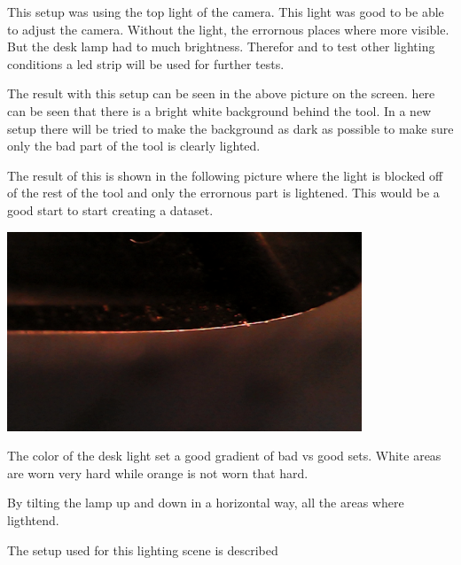 \documentclass{scrartcl}
\begin{document}
This setup was using the top light of the camera. This light was good to be able to adjust the camera. Without the light, the errornous places where more visible. But the desk lamp had to much brightness. Therefor and to test other lighting conditions a led strip will be used for further tests. 



The result with this setup can be seen in the above picture on the screen. here can be seen that there is a bright white background behind the tool. In a new setup there will be tried to make the background as dark as possible to make sure only the bad part of the tool is clearly lighted.



The result of this is shown in the following picture where the light is blocked off of the rest of the tool and only the errornous part is lightened. This would be a good start to start creating a dataset.



\includegraphics[width=4.166667in, keepaspectratio=true]{./Desk_Lamp_Test/eerste-opstelling_donkere_achtergrond2.jpg}



The color of the desk light set a good gradient of bad vs good sets. White areas are worn very hard while orange is not worn that hard.



By tilting the lamp up and down in a horizontal way, all the areas where ligthtend. 



The setup used for this lighting scene is described 
\end{document}
